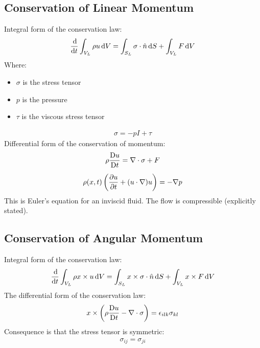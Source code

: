 \subsection{Conservation of Linear Momentum}
Integral form of the conservation law:
\begin{gather}
    \frac{\dif}{\dif t} \int_{V_L} \rho u \dif V = \int_{S_L} \sigma \cdot \hat{n} \dif S + \int_{V_L} F \dif V
\end{gather}
Where:
\begin{itemize}[noitemsep]
    \item $\sigma$ is the stress tensor
    \item $p$ is the pressure
    \item $\tau$ is the viscous stress tensor
\end{itemize}
\begin{gather}
    \sigma = -pI + \tau
\end{gather}
Differential form of the conservation of momentum:
\begin{gather}
    \rho \frac{\Dif u}{\Dif t} = \nabla \cdot \sigma + F \\[5pt]
    \rho (x,t) \left( \frac{\partial u}{\partial t} + (u\cdot \nabla)u \right) = -\nabla p
\end{gather}
This is Euler’s equation for an inviscid fluid.
The flow is compressible (explicitly stated).
\subsection{Conservation of Angular Momentum}
Integral form of the conservation law:
\begin{gather}
    \frac{\dif}{\dif t}\int_{V_L} \rho x \times u \dif V = \int_{S_L} x \times \sigma \cdot \hat{n} \dif S + \int_{V_L} x \times F \dif V
\end{gather}
The differential form of the conservation law:
\begin{gather}
    x \times \left( \rho \frac{\Dif u}{\Dif t} - \nabla \cdot \sigma \right) = \epsilon_{ilk}\sigma_{kl}
\end{gather}
Consequence is that the stress tensor is symmetric:
\begin{gather}
    \sigma_{ij} = \sigma_{ji}
\end{gather}
